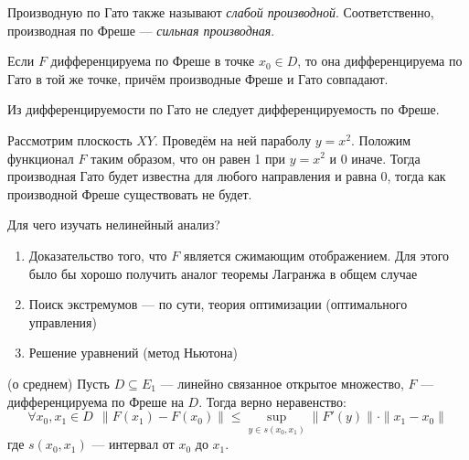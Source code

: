 \begin{note}
	Производную по Гато также называют \textit{слабой производной}. Соответственно, производная по Фреше --- \textit{сильная производная}.
\end{note}

\begin{exercise}
	Если $F$ дифференцируема по Фреше в точке $x_0 \in D$, то она дифференцируема по Гато в той же точке, причём производные Фреше и Гато совпадают.
\end{exercise}

\begin{exercise}
	Из дифференцируемости по Гато не следует дифференцируемость по Фреше.
\end{exercise}

\begin{solution}
	Рассмотрим плоскость $XY$. Проведём на ней параболу $y = x^2$. Положим функционал $F$ таким образом, что он равен 1 при $y = x^2$ и 0 иначе. Тогда производная Гато будет известна для любого направления и равна 0, тогда как производной Фреше существовать не будет.
\end{solution}

\begin{note}
	Для чего изучать нелинейный анализ?
	\begin{enumerate}
		\item Доказательство того, что $F$ является сжимающим отображением. Для этого было бы хорошо получить аналог теоремы Лагранжа в общем случае
		
		\item Поиск экстремумов --- по сути, теория оптимизации (оптимального управления)
		
		\item Решение уравнений (метод Ньютона)
	\end{enumerate}
\end{note}

\begin{theorem} (о среднем)
	Пусть $D \subseteq E_1$ --- линейно связанное открытое множество, $F$ --- дифференцируема по Фреше на $D$. Тогда верно неравенство:
	\[
		\forall x_0, x_1 \in D\ \ \|F(x_1) - F(x_0)\| \le \sup_{y \in s(x_0, x_1)} \|F'(y)\| \cdot \|x_1 - x_0\|
	\]
	где $s(x_0, x_1)$ --- интервал от $x_0$ до $x_1$.
\end{theorem}

